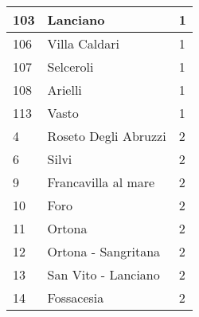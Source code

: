 \begin{table}[]
\begin{tabular}{|p{1cm}|p{4cm}|p{2cm}|}
\rowcolor[HTML]{9AFF99} 
103 & Lanciano                                 & 1      \\ \hline
\rowcolor[HTML]{9AFF99} 
106 & Villa Caldari                            & 1      \\ \hline
\rowcolor[HTML]{9AFF99} 
107 & Selceroli                                & 1      \\ \hline
\rowcolor[HTML]{9AFF99} 
108 & Arielli                                  & 1      \\ \hline
\rowcolor[HTML]{9AFF99} 
113 & Vasto                                    & 1      \\ \hline
\rowcolor[HTML]{FFFE65} 
4   & Roseto Degli Abruzzi                     & 2      \\ \hline
\rowcolor[HTML]{FFFE65} 
6   & Silvi                                    & 2      \\ \hline
\rowcolor[HTML]{FFFE65} 
9   & Francavilla al mare                      & 2      \\ \hline
\rowcolor[HTML]{FFFE65} 
10  & Foro                                     & 2      \\ \hline
\rowcolor[HTML]{FFFE65} 
11  & Ortona                                   & 2      \\ \hline
\rowcolor[HTML]{FFFE65} 
12  & Ortona - Sangritana                      & 2      \\ \hline
\rowcolor[HTML]{FFFE65} 
13  & San Vito - Lanciano                      & 2      \\ \hline
\rowcolor[HTML]{FFFE65} 
14  & Fossacesia                               & 2      \\ \hline

\end{tabular}
\end{table}


